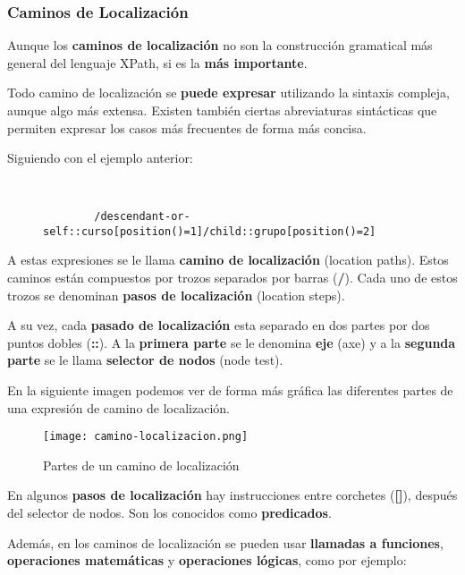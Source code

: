 \subsubsection{Caminos de Localización}
Aunque los \textbf{caminos de localización} no son la construcción gramatical más general del lenguaje XPath, si es la \textbf{más importante}.

Todo camino de localización se \textbf{puede expresar} utilizando la sintaxis compleja, aunque algo más extensa. Existen también ciertas abreviaturas sintácticas que permiten expresar los casos más frecuentes de forma más concisa.

Siguiendo con el ejemplo anterior:

\begin{figure}[H]
    \begin{tcolorbox}[sharp corners, colback=yellow!30, colframe=white!20]
        \scriptsize
        \begin{verbatim}


        /descendant-or-self::curso[position()=1]/child::grupo[position()=2]
        \end{verbatim}
    \end{tcolorbox}
\end{figure}

A estas expresiones se le llama \textbf{camino de localización} (location paths). Estos caminos están compuestos por trozos separados por barras (\textbf{/}). Cada uno de estos trozos se denominan \textbf{pasos de localización} (location steps).

A su vez, cada \textbf{pasado de localización} esta separado en dos partes por dos puntos dobles (\textbf{::}). A la \textbf{primera parte} se le denomina \textbf{eje} (axe) y a la \textbf{segunda parte} se le llama \textbf{selector de nodos} (node test).

En la siguiente imagen podemos ver de forma más gráfica las diferentes partes de una expresión de camino de localización.

\begin{figure}[H]
    \centering
    \texttt{[image: camino-localizacion.png]}
    \caption{Partes de un camino de localización}
\end{figure}

En algunos \textbf{pasos de localización} hay instrucciones entre corchetes (\textbf{[]}), después del selector de nodos. Son los conocidos como \textbf{predicados}.

Además, en los caminos de localización se pueden usar \textbf{llamadas a funciones}, \textbf{operaciones matemáticas} y \textbf{operaciones lógicas}, como por ejemplo:

